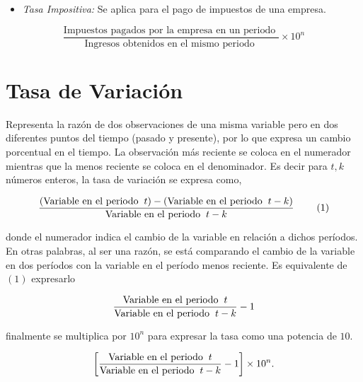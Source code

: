 \documentclass[
]{book}
\providecommand{\tightlist}{%
  \setlength{\itemsep}{0pt}\setlength{\parskip}{0pt}}
\begin{document}
\begin{itemize}
\tightlist
\item
  \emph{Tasa Impositiva:} Se aplica para el pago de impuestos de una empresa.
\end{itemize}

\[\begin{equation}
\frac{\text{Impuestos pagados por la empresa en un periodo }}{\text{Ingresos obtenidos en el mismo periodo }}\times 10^{n}
\end{equation}\]

\hypertarget{tasavariaciuxf3n}{%
\section{Tasa de Variación}\label{tasavariaciuxf3n}}

Representa la razón de dos observaciones de una misma variable pero en dos diferentes puntos del tiempo (pasado y presente), por lo que expresa un cambio porcentual en el tiempo. La observación más reciente se coloca en el numerador mientras que la menos reciente se coloca en el denominador. Es decir para \(t,k\) números enteros, la tasa de variación se expresa como,

\[\begin{equation}
\frac{\text{(Variable en el periodo}\hspace{2mm} t)-(\text{Variable en el periodo} \hspace{2mm} t-k)}{\text{Variable en el periodo} \hspace{2mm} t-k} \hspace{8mm} \text{(1)}
\end{equation}\]

donde el numerador indica el cambio de la variable en relación a dichos períodos. En otras palabras, al ser una razón, se está comparando el cambio de la variable en dos períodos con la variable en el período menos reciente. Es equivalente de \((1)\) expresarlo

\[\begin{equation}
\frac{\text{Variable en el periodo}\hspace{2mm} t}{\text{Variable en el periodo} \hspace{2mm} t-k}-1
\end{equation}\]

finalmente se multiplica por \(10^{n}\) para expresar la tasa como una potencia de \(10\).

\[\begin{equation}
\left[\frac{\text{Variable en el periodo}\hspace{2mm} t}{\text{Variable en el periodo} \hspace{2mm} t-k}-1 \right] \times 10^{n}.
\end{equation}\]
\end{document}
